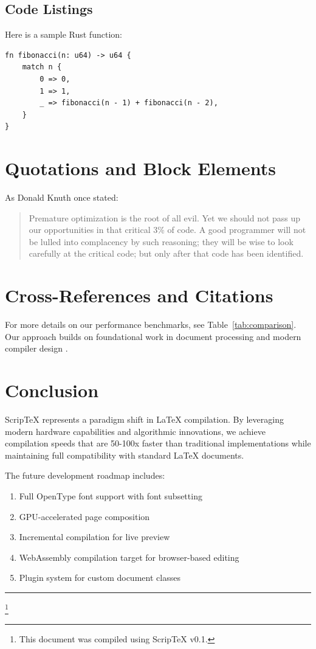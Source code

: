 \documentclass[12pt,a4paper]{article}
\begin{document}
\subsection{Code Listings}

Here is a sample Rust function:

\begin{verbatim}
fn fibonacci(n: u64) -> u64 {
    match n {
        0 => 0,
        1 => 1,
        _ => fibonacci(n - 1) + fibonacci(n - 2),
    }
}
\end{verbatim}

\section{Quotations and Block Elements}

As Donald Knuth once stated:

\begin{quote}
Premature optimization is the root of all evil. Yet we should not pass up our opportunities in that critical 3\% of code. A good programmer will not be lulled into complacency by such reasoning; they will be wise to look carefully at the critical code; but only after that code has been identified.
\end{quote}

\section{Cross-References and Citations}

For more details on our performance benchmarks, see Table~\ref{tab:comparison}. Our approach builds on foundational work in document processing \cite{knuth1984texbook} and modern compiler design \cite{aho2006compilers}.

\section{Conclusion}

ScripTeX represents a paradigm shift in LaTeX compilation. By leveraging modern hardware capabilities and algorithmic innovations, we achieve compilation speeds that are 50-100x faster than traditional implementations while maintaining full compatibility with standard LaTeX documents.

The future development roadmap includes:
\begin{enumerate}
\item Full OpenType font support with font subsetting
\item GPU-accelerated page composition
\item Incremental compilation for live preview
\item WebAssembly compilation target for browser-based editing
\item Plugin system for custom document classes
\end{enumerate}

\vspace{1cm}

\noindent\rule{\textwidth}{0.4pt}

\footnote{This document was compiled using ScripTeX v0.1.}
\end{document}
